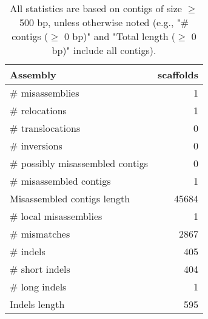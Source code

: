 \documentclass[12pt,a4paper]{article}
\begin{document}
\begin{table}[ht]
\begin{center}
\caption{All statistics are based on contigs of size $\geq$ 500 bp, unless otherwise noted (e.g., "\# contigs ($\geq$ 0 bp)" and "Total length ($\geq$ 0 bp)" include all contigs).}
\begin{tabular}{|l*{1}{|r}|}
\hline
Assembly & scaffolds \\ \hline
\# misassemblies & 1 \\ \hline
\hspace{5mm}\# relocations & 1 \\ \hline
\hspace{5mm}\# translocations & 0 \\ \hline
\hspace{5mm}\# inversions & 0 \\ \hline
\# possibly misassembled contigs & 0 \\ \hline
\# misassembled contigs & 1 \\ \hline
Misassembled contigs length & 45684 \\ \hline
\# local misassemblies & 1 \\ \hline
\# mismatches & 2867 \\ \hline
\# indels & 405 \\ \hline
\hspace{5mm}\# short indels & 404 \\ \hline
\hspace{5mm}\# long indels & 1 \\ \hline
Indels length & 595 \\ \hline
\end{tabular}
\end{center}
\end{table}
\end{document}
